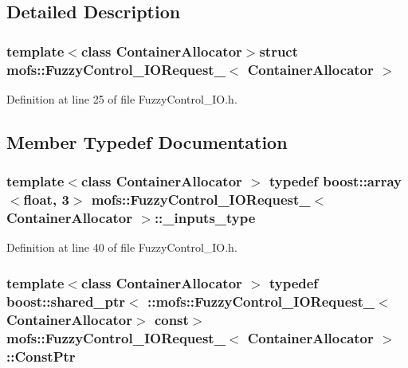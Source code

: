 \subsection{Detailed Description}
\subsubsection*{template$<$class Container\-Allocator$>$struct mofs\-::\-Fuzzy\-Control\-\_\-\-I\-O\-Request\-\_\-$<$ Container\-Allocator $>$}



Definition at line 25 of file Fuzzy\-Control\-\_\-\-I\-O.\-h.



\subsection{Member Typedef Documentation}
\subsubsection[{\-\_\-inputs\-\_\-type}]{\setlength{\rightskip}{0pt plus 5cm}template$<$class Container\-Allocator $>$ typedef boost\-::array$<$float, 3$>$ {\bf mofs\-::\-Fuzzy\-Control\-\_\-\-I\-O\-Request\-\_\-}$<$ Container\-Allocator $>$\-::{\bf \-\_\-inputs\-\_\-type}}\label{structmofs_1_1FuzzyControl__IORequest___a8bf3c09eab0aa2be3371511ba6d5237e}


Definition at line 40 of file Fuzzy\-Control\-\_\-\-I\-O.\-h.

\subsubsection[{Const\-Ptr}]{\setlength{\rightskip}{0pt plus 5cm}template$<$class Container\-Allocator $>$ typedef boost\-::shared\-\_\-ptr$<$ \-::{\bf mofs\-::\-Fuzzy\-Control\-\_\-\-I\-O\-Request\-\_\-}$<$Container\-Allocator$>$ const$>$ {\bf mofs\-::\-Fuzzy\-Control\-\_\-\-I\-O\-Request\-\_\-}$<$ Container\-Allocator $>$\-::{\bf Const\-Ptr}}\label{structmofs_1_1FuzzyControl__IORequest___a30a0a4303309876f855609a0b54c8563}


